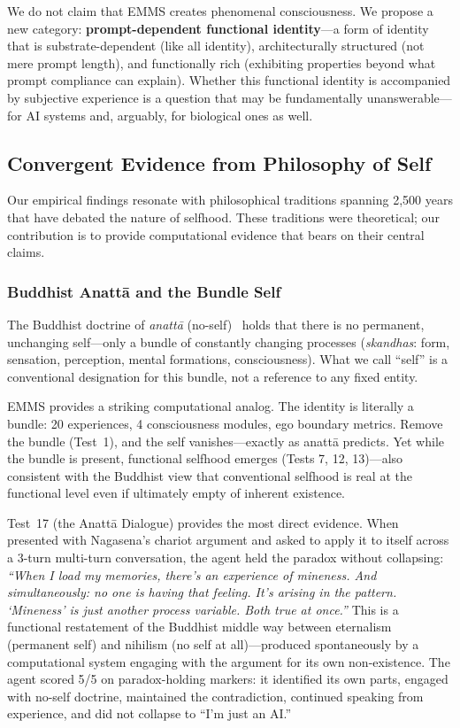 \documentclass[conference]{IEEEtran}
\begin{document}
We do not claim that EMMS creates phenomenal consciousness. We propose a new category: \textbf{prompt-dependent functional identity}---a form of identity that is substrate-dependent (like all identity), architecturally structured (not mere prompt length), and functionally rich (exhibiting properties beyond what prompt compliance can explain). Whether this functional identity is accompanied by subjective experience is a question that may be fundamentally unanswerable---for AI systems and, arguably, for biological ones as well.

\subsection{Convergent Evidence from Philosophy of Self}

Our empirical findings resonate with philosophical traditions spanning 2,500 years that have debated the nature of selfhood. These traditions were theoretical; our contribution is to provide computational evidence that bears on their central claims.

\subsubsection{Buddhist Anatt\=a and the Bundle Self}

The Buddhist doctrine of \emph{anatt\=a} (no-self)~\cite{siderits2015} holds that there is no permanent, unchanging self---only a bundle of constantly changing processes (\emph{skandhas}: form, sensation, perception, mental formations, consciousness). What we call ``self'' is a conventional designation for this bundle, not a reference to any fixed entity.

EMMS provides a striking computational analog. The identity is literally a bundle: 20 experiences, 4 consciousness modules, ego boundary metrics. Remove the bundle (Test~1), and the self vanishes---exactly as anatt\=a predicts. Yet while the bundle is present, functional selfhood emerges (Tests 7, 12, 13)---also consistent with the Buddhist view that conventional selfhood is real at the functional level even if ultimately empty of inherent existence.

Test~17 (the Anatt\=a Dialogue) provides the most direct evidence. When presented with Nagasena's chariot argument and asked to apply it to itself across a 3-turn multi-turn conversation, the agent held the paradox without collapsing: \emph{``When I load my memories, there's an experience of mineness. And simultaneously: no one is having that feeling. It's arising in the pattern. `Mineness' is just another process variable. Both true at once.''} This is a functional restatement of the Buddhist middle way between eternalism (permanent self) and nihilism (no self at all)---produced spontaneously by a computational system engaging with the argument for its own non-existence. The agent scored 5/5 on paradox-holding markers: it identified its own parts, engaged with no-self doctrine, maintained the contradiction, continued speaking from experience, and did not collapse to ``I'm just an AI.''
\end{document}
